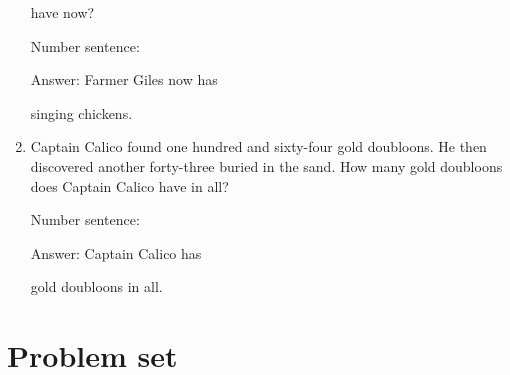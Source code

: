 \documentclass{tufte-book}
\begin{document}
\begin{enumerate}
  have now?\medskip\par
  Number sentence:
  \dotfill\medskip\par
  Answer: Farmer Giles now has
  \dotfill\medskip\par\mbox{}\dotfill\medskip\par\mbox{}\dotfill\bigskip
  singing chickens.
\item
  Captain Calico found one hundred and sixty-four gold doubloons. He
  then discovered another forty-three buried in the sand. How many gold
  doubloons does Captain Calico have in all?\medskip\par
  Number sentence:
  \dotfill\medskip\par
  Answer: Captain Calico has
  \dotfill\medskip\par\mbox{}\dotfill\medskip\par\mbox{}\dotfill\bigskip
  gold doubloons in all.
\end{enumerate}



\clearpage\section{Problem set }
\end{document}
